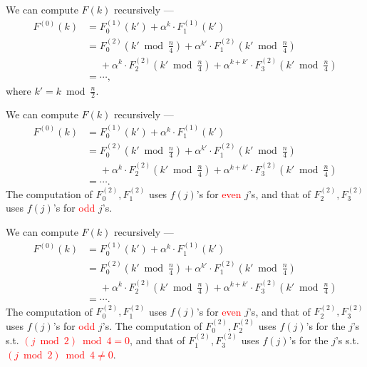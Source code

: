 \documentclass{beamer}	%
\theoremstyle{plain}
\theoremstyle{definition}
\theoremstyle{remark}
\numberwithin{equation}{section}
\begin{document}
\begin{frame}
We can compute $F(k)$ recursively ---
\begin{align*}
F^{(0)}(k) &= F^{(1)}_0(k') + \alpha^{k} \cdot F^{(1)}_1(k') \\
           &= F^{(2)}_0(k' \bmod \frac{n}{4}) + \alpha^{k'} \cdot F^{(2)}_1(k' \bmod \frac{n}{4})  \\
           &\phantom{=} + \alpha^{k} \cdot F^{(2)}_2(k' \bmod \frac{n}{4}) + \alpha^{k+k'} \cdot F^{(2)}_3(k' \bmod \frac{n}{4}) \\
           &= \cdots,
\end{align*}
where $k' = k \bmod \frac{n}{2}$.
\end{frame}

\begin{frame}
We can compute $F(k)$ recursively ---
\begin{align*}
F^{(0)}(k) &= F^{(1)}_0(k') + \alpha^{k} \cdot F^{(1)}_1(k') \\
&= F^{(2)}_0(k' \bmod \frac{n}{4}) + \alpha^{k'} \cdot F^{(2)}_1(k' \bmod \frac{n}{4})  \\
&\phantom{=} + \alpha^{k} \cdot F^{(2)}_2(k' \bmod \frac{n}{4}) + \alpha^{k+k'} \cdot F^{(2)}_3(k' \bmod \frac{n}{4}) \\
&= \cdots.
\end{align*}
The computation of $F^{(2)}_0, F^{(2)}_1$ uses $f(j)$'s for \textcolor{red}{even} $j$'s, and that of $F^{(2)}_2, F^{(2)}_3$ uses $f(j)$'s for \textcolor{red}{odd} $j$'s.
\end{frame}

\begin{frame}
We can compute $F(k)$ recursively ---
\begin{align*}
F^{(0)}(k) &= F^{(1)}_0(k') + \alpha^{k} \cdot F^{(1)}_1(k') \\
&= F^{(2)}_0(k' \bmod \frac{n}{4}) + \alpha^{k'} \cdot F^{(2)}_1(k' \bmod \frac{n}{4})  \\
&\phantom{=} + \alpha^{k} \cdot F^{(2)}_2(k' \bmod \frac{n}{4}) + \alpha^{k+k'} \cdot F^{(2)}_3(k' \bmod \frac{n}{4}) \\
&= \cdots.
\end{align*}
The computation of $F^{(2)}_0, F^{(2)}_1$ uses $f(j)$'s for \textcolor{red}{even} $j$'s, and that of $F^{(2)}_2, F^{(2)}_3$ uses $f(j)$'s for \textcolor{red}{odd} $j$'s. The computation of $F^{(2)}_0, F^{(2)}_2$ uses $f(j)$'s for the $j$'s s.t. \textcolor{red}{$(j \bmod 2) \bmod 4 = 0$}, and that of $F^{(2)}_1, F^{(2)}_3$ uses $f(j)$'s for the $j$'s s.t. \textcolor{red}{$(j \bmod 2) \bmod 4 \ne 0$}.
\end{frame}
\end{document}
